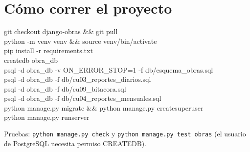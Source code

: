 \documentclass[11pt,letterpaper]{article}
\newcommand{\cod}[1]{\texttt{\small #1}}
\begin{document}
\section{Cómo correr el proyecto}
\begin{tcolorbox}[colback=grisfondo,colframe=grisfondo,arc=2pt,fontupper=\ttfamily\footnotesize]
git checkout django-obras \&\& git pull\\
python -m venv venv \&\& source venv/bin/activate\\
pip install -r requirements.txt\\
createdb obra\_db\\
psql -d obra\_db -v ON\_ERROR\_STOP=1 -f db/esquema\_obras.sql\\
psql -d obra\_db -f db/cu03\_reportes\_diarios.sql\\
psql -d obra\_db -f db/cu09\_bitacora.sql\\
psql -d obra\_db -f db/cu04\_reportes\_mensuales.sql\\
python manage.py migrate \&\& python manage.py createsuperuser\\
python manage.py runserver
\end{tcolorbox}
Pruebas: \cod{python manage.py check} y \cod{python manage.py test obras} (el usuario de PostgreSQL necesita permiso CREATEDB).
\end{document}
